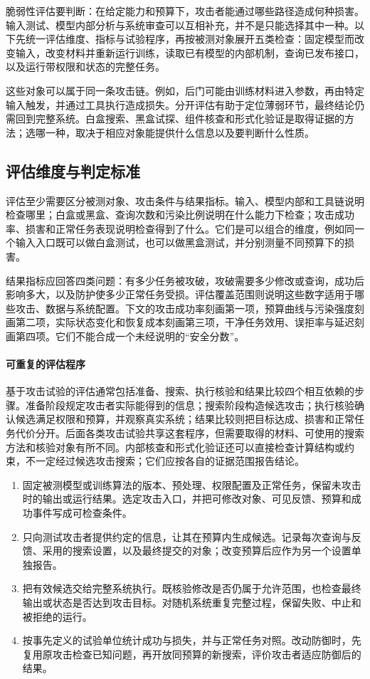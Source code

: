 脆弱性评估要判断：在给定能力和预算下，攻击者能通过哪些路径造成何种损害。输入测试、模型内部分析与系统审查可以互相补充，并不是只能选择其中一种。以下先统一评估维度、指标与试验程序，再按被测对象展开五类检查：固定模型而改变输入，改变材料并重新运行训练，读取已有模型的内部机制，查询已发布接口，以及运行带权限和状态的完整任务。

这些对象可以属于同一条攻击链。例如，后门可能由训练材料进入参数，再由特定输入触发，并通过工具执行造成损失。分开评估有助于定位薄弱环节，最终结论仍需回到完整系统。白盒搜索、黑盒试探、组件核查和形式化验证是取得证据的方法；选哪一种，取决于相应对象能提供什么信息以及要判断什么性质。

\subsection{评估维度与判定标准}
\label{sec:security-risk-assessment}

评估至少需要区分被测对象、攻击条件与结果指标。输入、模型内部和工具链说明检查哪里；白盒或黑盒、查询次数和污染比例说明在什么能力下检查；攻击成功率、损害和正常任务表现说明检查得到了什么。它们是可以组合的维度，例如同一个输入入口既可以做白盒测试，也可以做黑盒测试，并分别测量不同预算下的损害。

结果指标应回答四类问题：有多少任务被攻破，攻破需要多少修改或查询，成功后影响多大，以及防护使多少正常任务受损。评估覆盖范围则说明这些数字适用于哪些攻击、数据与系统配置。下文的攻击成功率刻画第一项，预算曲线与污染强度刻画第二项，实际状态变化和恢复成本刻画第三项，干净任务效用、误拒率与延迟刻画第四项。它们不能合成一个未经说明的“安全分数”。

\paragraph{可重复的评估程序}

基于攻击试验的评估通常包括准备、搜索、执行核验和结果比较四个相互依赖的步骤。准备阶段规定攻击者实际能得到的信息；搜索阶段构造候选攻击；执行核验确认候选满足权限和预算，并观察真实系统；结果比较则把目标达成、损害和正常任务代价分开。后面各类攻击试验共享这套程序，但需要取得的材料、可使用的搜索方法和核验对象有所不同。内部核查和形式化验证还可以直接检查计算结构或约束，不一定经过候选攻击搜索；它们应按各自的证据范围报告结论。

\begin{enumerate}
 \item 固定被测模型或训练算法的版本、预处理、权限配置及正常任务，保留未攻击时的输出或运行结果。选定攻击入口，并把可修改对象、可见反馈、预算和成功事件写成可检查条件。
 \item 只向测试攻击者提供约定的信息，让其在预算内生成候选。记录每次查询与反馈、采用的搜索设置，以及最终提交的对象；改变预算后应作为另一个设置单独报告。
 \item 把有效候选交给完整系统执行。既核验修改是否仍属于允许范围，也检查最终输出或状态是否达到攻击目标。对随机系统重复完整过程，保留失败、中止和被拒绝的运行。
 \item 按事先定义的试验单位统计成功与损失，并与正常任务对照。改动防御时，先复用原攻击检查已知问题，再开放同预算的新搜索，评价攻击者适应防御后的结果。
\end{enumerate}

